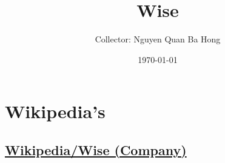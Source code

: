 \documentclass{book}
\title{Wise}
\author{Collector: Nguyen Quan Ba Hong}
\date{\today}
\numberwithin{equation}{section}
\begin{document}
\maketitle
\setcounter{secnumdepth}{6}
\setcounter{tocdepth}{6}
\tableofcontents


\part{Wikipedia's}

\chapter{\href{https://en.wikipedia.org/wiki/Wise_(company)}{Wikipedia/Wise (Company)}}
\end{document}
